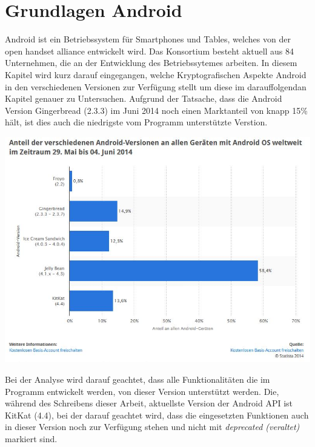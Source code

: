 \documentclass[10pt, a4paper]{scrreprt}
\begin{document}
\chapter{Grundlagen Android}
Android ist ein Betriebssystem für Smartphones und Tables, welches von der open handset alliance entwickelt wird. Das Konsortium besteht aktuell aus 84 Unternehmen, die an der Entwicklung des Betriebssytemes arbeiten. %
In diesem Kapitel wird kurz darauf eingegangen, welche Kryptografischen Aspekte Android in den verschiedenen Versionen zur Verfügung stellt um diese im darauffolgendan Kapitel genauer zu Untersuchen. Aufgrund der Tatsache, dass die Android Version Gingerbread (2.3.3) im Juni 2014 noch einen Marktanteil von knapp 15\% hält, ist dies auch die niedrigste vom Programm unterstützte Verstion. \\
\begin{center}
\includegraphics[scale=0.6]{android_version_marktanteil.JPG} %
\end{center}
Bei der Analyse wird darauf geachtet, dass alle Funktionalitäten die im Programm entwickelt werden, von dieser Version unterstützt werden. Die, während des Schreibens dieser Arbeit, aktuellste Version der Android API ist KitKat (4.4), bei der darauf geachtet wird, dass die eingesetzten Funktionen auch in dieser Version noch zur Verfügung stehen und nicht mit \textit{deprecated (veraltet)} markiert sind.
\end{document}
